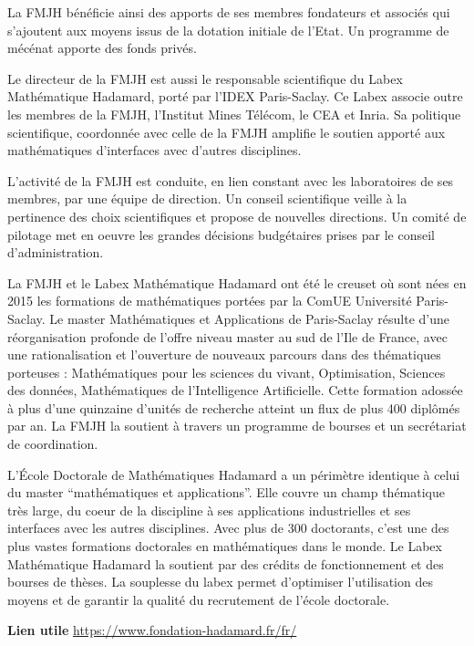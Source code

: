 La FMJH b\'en\'eficie ainsi des apports de ses membres fondateurs et associ\'es qui s'ajoutent aux moyens issus de la dotation initiale de l'Etat. Un programme de m\'ec\'enat apporte des fonds priv\'es. 

Le directeur de la FMJH est aussi le responsable scientifique du Labex Math\'ematique Hadamard, port\'e par l'IDEX Paris-Saclay. Ce Labex associe outre les membres de la FMJH, l'Institut Mines T\'el\'ecom, le CEA et Inria. Sa politique scientifique, coordonn\'ee avec celle de la FMJH amplifie le soutien apport\'e aux math\'ematiques d’interfaces avec d’autres disciplines.

L'activit\'e de la FMJH est conduite, en lien constant avec les laboratoires de ses membres, par une \'equipe de direction. Un conseil scientifique veille \`a la pertinence des choix scientifiques et propose de nouvelles directions. Un comit\'e de  pilotage met en oeuvre les grandes d\'ecisions budg\'etaires prises par le conseil d'administration.


La FMJH et le Labex Math\'ematique Hadamard ont \'et\'e le creuset où sont n\'ees en 2015 les formations de math\'ematiques port\'ees par la ComUE Universit\'e Paris-Saclay. Le master Math\'ematiques et Applications de Paris-Saclay r\'esulte d'une r\'eorganisation profonde de l'offre niveau master au sud de l'Ile de France, avec une rationalisation et l'ouverture de nouveaux parcours dans des th\'ematiques porteuses : Math\'ematiques pour les sciences du vivant, Optimisation, Sciences des donn\'ees, Math\'ematiques de l'Intelligence Artificielle. Cette formation adoss\'ee \`a plus d’une quinzaine d’unit\'es de recherche atteint un flux de plus 400 diplôm\'es par an. La FMJH la soutient \`a travers un programme de bourses et un secr\'etariat de coordination.
 
L'\'Ecole Doctorale de Math\'ematiques Hadamard a un p\'erim\`etre identique \`a celui du master ``math\'ematiques et applications''. Elle couvre un champ th\'ematique tr\`es large, du coeur de la discipline \`a ses applications industrielles et ses interfaces avec les autres disciplines. Avec plus de 300 doctorants, c'est une des plus vastes formations doctorales en math\'ematiques dans le monde. Le Labex Math\'ematique Hadamard la soutient par des cr\'edits de fonctionnement et des bourses de th\`eses. La souplesse du labex permet d'optimiser l'utilisation des moyens et de garantir la qualit\'e du recrutement de l'\'ecole doctorale.

\textbf{Lien utile\hspace{.5em}}
\url{https://www.fondation-hadamard.fr/fr/}